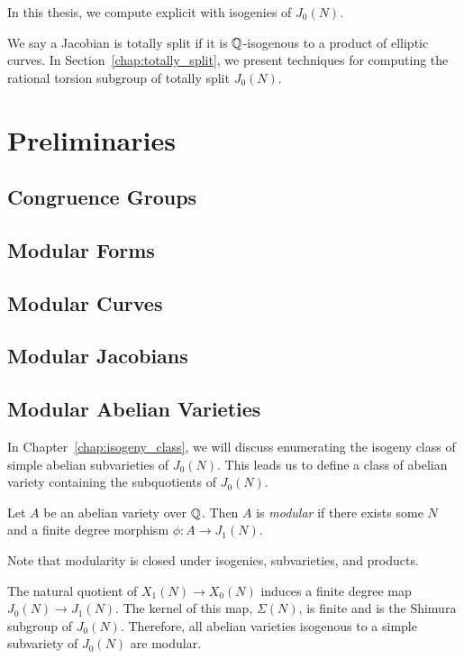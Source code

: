 \documentclass[11pt, proquest]{uwthesis}
\begin{document}
In this thesis, we compute explicit with isogenies of $J_0(N)$. 

We say a Jacobian is totally split if it is $\mathbb{Q}$-isogenous to a product of
elliptic curves. In Section~\ref{chap:totally_split}, we present techniques for
computing the rational torsion subgroup of totally split $J_0(N)$.



\chapter{Preliminaries}%
\label{chap:prelim}

\section{Congruence Groups}

\section{Modular Forms}

\section{Modular Curves}

\section{Modular Jacobians}

\section{Modular Abelian Varieties}

In Chapter~\ref{chap:isogeny_class}, we will discuss enumerating the isogeny
class of simple abelian subvarieties of $J_0(N)$. This leads us to define a
class of abelian variety containing the subquotients of $J_0(N)$.

\begin{definition}
    \label{defn:modabvar}
    Let $A$ be an abelian variety over $\mathbb{Q}$. Then $A$ is \emph{modular} if
    there exists some $N$ and a finite degree morphism $\phi:A\to J_1(N)$.

    Note that modularity is closed under isogenies, subvarieties, and products.
\end{definition}

The natural quotient of $X_1(N)\to X_0(N)$ induces a finite degree map
$J_0(N)\to J_1(N)$. The kernel of this map, $\Sigma(N)$, is finite and is the
Shimura subgroup of $J_0(N)$. Therefore, all abelian varieties isogenous to a
simple subvariety of $J_0(N)$ are modular.
\end{document}
